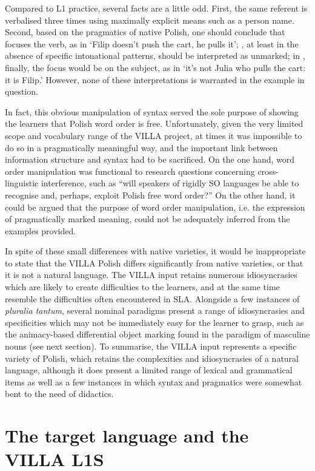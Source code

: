 Compared to L1 practice, several facts are a little odd. First, the same referent is verbalised three times using maximally explicit means such as a person name. Second, based on the pragmatics of native Polish, one should conclude that  focuses the verb, as in ‘Filip doesn't push the cart, he pulls it’; , at least in the absence of specific intonational patterns, should be interpreted as unmarked; in , finally, the focus would be on the subject, as in ‘it's not Julia who pulls the cart: it is Filip.' However, none of these interpretations is warranted in the example in question.

In fact, this obvious manipulation of syntax served the sole purpose of showing the learners that Polish word order is free. Unfortunately, given the very limited scope and vocabulary range of the VILLA project, at times it was impossible to do so in a pragmatically meaningful way, and the important link between information structure and syntax had to be sacrificed. On the one hand, word order manipulation was functional to research questions concerning cross-linguistic interference, such as “will speakers of rigidly SO languages be able to recognise and, perhaps, exploit Polish free word order?” On the other hand, it could be argued that the purpose of word order manipulation, i.e. the expression of pragmatically marked meaning, could not be adequately inferred from the examples provided. 

In spite of these small differences with native varieties, it would be inappropriate to state that the VILLA Polish differs significantly from native varieties, or that it is not a natural language. The VILLA input retains numerous idiosyncrasies which are likely to create difficulties to the learners, and at the same time resemble the difficulties often encountered in SLA. Alongside a few instances of \textit{pluralia tantum}, several nominal paradigms present a range of idiosyncrasies and specificities which may not be immediately easy for the learner to grasp, such as the animacy-based differential object marking found in the paradigm of masculine nouns (see next section). To summarise, the VILLA input represents a specific variety of Polish, which retains the complexities and idiosyncrasies of a natural language, although it does present a limited range of lexical and grammatical items as well as a few instances in which syntax and pragmatics were somewhat bent to the need of didactics.

\section{The target language and the VILLA L1S}\label{sec:02:2}
